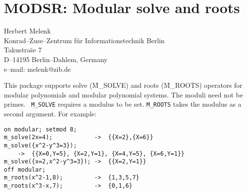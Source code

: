 \chapter{MODSR: Modular solve and roots}
\label{MODSR}
{\footnotesize
\begin{center}
Herbert Melenk \\
Konrad--Zuse--Zentrum f\"ur Informationstechnik Berlin \\
Takustra\"se 7 \\
D--14195 Berlin--Dahlem, Germany \\[0.05in]
e--mail: melenk@zib.de
\end{center}
}

This package supports solve (\f{M\_SOLVE}) and roots
(\f{M\_ROOTS}) operators for modular polynomials and
modular polynomial systems.  The moduli need not be primes.  {\tt
M\_SOLVE} requires a modulus to be set.  {\tt M\_ROOTS} takes the
modulus as a second argument. For example:

\begin{verbatim}
on modular; setmod 8;
m_solve(2x=4);            ->  {{X=2},{X=6}}
m_solve({x^2-y^3=3});
    ->  {{X=0,Y=5}, {X=2,Y=1}, {X=4,Y=5}, {X=6,Y=1}}
m_solve({x=2,x^2-y^3=3}); ->  {{X=2,Y=1}}
off modular;
m_roots(x^2-1,8);         ->  {1,3,5,7}
m_roots(x^3-x,7);         ->  {0,1,6}
\end{verbatim}

